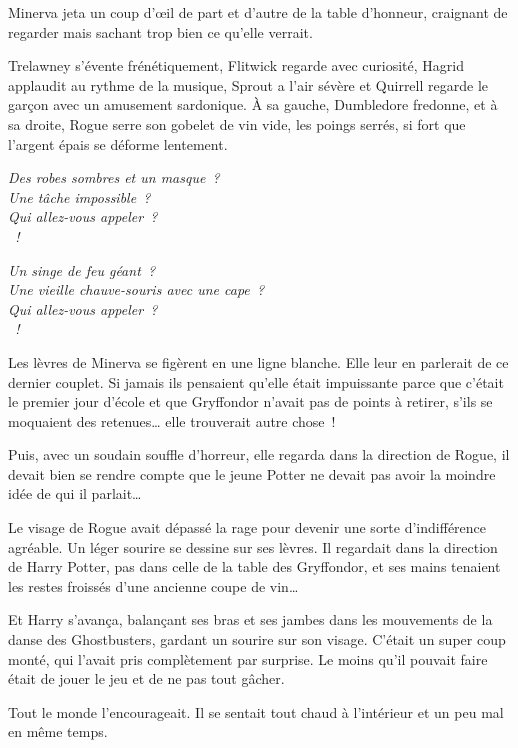 Minerva jeta un coup d'œil de part et d'autre de la table d'honneur, craignant de regarder mais sachant trop bien ce qu'elle verrait.

Trelawney s'évente frénétiquement, Flitwick regarde avec curiosité, Hagrid applaudit au rythme de la musique, Sprout a l'air sévère et Quirrell regarde le garçon avec un amusement sardonique. À sa gauche, Dumbledore fredonne, et à sa droite, Rogue serre son gobelet de vin vide, les poings serrés, si fort que l'argent épais se déforme lentement.

\begin{center}
\emph{Des robes sombres et un masque~?\\
Une tâche impossible~?\\
Qui allez-vous appeler~?\\
~!}

\emph{Un singe de feu géant~?\\
Une vieille chauve-souris avec une cape~?\\
Qui allez-vous appeler~?\\
~!}
\end{center}

Les lèvres de Minerva se figèrent en une ligne blanche. Elle leur en parlerait de ce dernier couplet. Si jamais ils pensaient qu'elle était impuissante parce que c'était le premier jour d'école et que Gryffondor n'avait pas de points à retirer, s'ils se moquaient des retenues… elle trouverait autre chose~!

Puis, avec un soudain souffle d'horreur, elle regarda dans la direction de Rogue, il devait bien se rendre compte que le jeune Potter ne devait pas avoir la moindre idée de qui il parlait…

Le visage de Rogue avait dépassé la rage pour devenir une sorte d'indifférence agréable. Un léger sourire se dessine sur ses lèvres. Il regardait dans la direction de Harry Potter, pas dans celle de la table des Gryffondor, et ses mains tenaient les restes froissés d'une ancienne coupe de vin…

Et Harry s'avança, balançant ses bras et ses jambes dans les mouvements de la danse des Ghostbusters, gardant un sourire sur son visage. C'était un super coup monté, qui l'avait pris complètement par surprise. Le moins qu'il pouvait faire était de jouer le jeu et de ne pas tout gâcher.

Tout le monde l'encourageait. Il se sentait tout chaud à l'intérieur et un peu mal en même temps.

